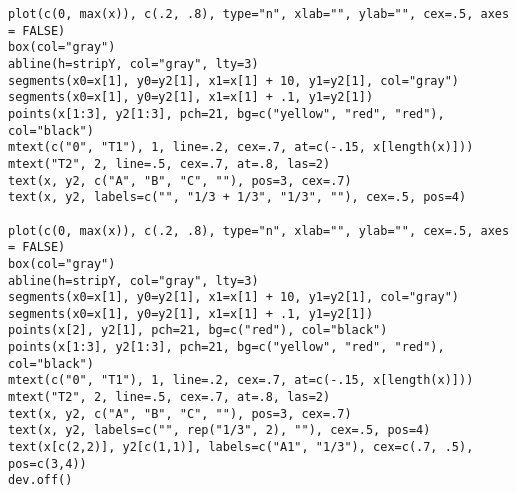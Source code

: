 \documentclass[]{article}
\begin{document}
{{\begin{verbatim}
plot(c(0, max(x)), c(.2, .8), type="n", xlab="", ylab="", cex=.5, axes = FALSE)
box(col="gray")
abline(h=stripY, col="gray", lty=3)
segments(x0=x[1], y0=y2[1], x1=x[1] + 10, y1=y2[1], col="gray")
segments(x0=x[1], y0=y2[1], x1=x[1] + .1, y1=y2[1])
points(x[1:3], y2[1:3], pch=21, bg=c("yellow", "red", "red"), col="black")
mtext(c("0", "T1"), 1, line=.2, cex=.7, at=c(-.15, x[length(x)]))
mtext("T2", 2, line=.5, cex=.7, at=.8, las=2)
text(x, y2, c("A", "B", "C", ""), pos=3, cex=.7)
text(x, y2, labels=c("", "1/3 + 1/3", "1/3", ""), cex=.5, pos=4)

plot(c(0, max(x)), c(.2, .8), type="n", xlab="", ylab="", cex=.5, axes = FALSE)
box(col="gray")
abline(h=stripY, col="gray", lty=3)
segments(x0=x[1], y0=y2[1], x1=x[1] + 10, y1=y2[1], col="gray")
segments(x0=x[1], y0=y2[1], x1=x[1] + .1, y1=y2[1])
points(x[2], y2[1], pch=21, bg=c("red"), col="black")
points(x[1:3], y2[1:3], pch=21, bg=c("yellow", "red", "red"), col="black")
mtext(c("0", "T1"), 1, line=.2, cex=.7, at=c(-.15, x[length(x)]))
mtext("T2", 2, line=.5, cex=.7, at=.8, las=2)
text(x, y2, c("A", "B", "C", ""), pos=3, cex=.7)
text(x, y2, labels=c("", rep("1/3", 2), ""), cex=.5, pos=4)
text(x[c(2,2)], y2[c(1,1)], labels=c("A1", "1/3"), cex=c(.7, .5), pos=c(3,4))
dev.off()
  \end{verbatim}
  }}
\end{document}

